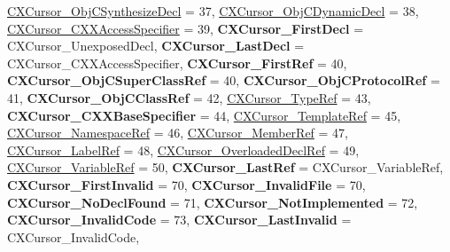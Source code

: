 \begin{DoxyCompactItemize}
\newline
\mbox{\hyperlink{group__CINDEX_ggaaccc432245b4cd9f2d470913f9ef0013a3d4faa898af63cdb556188e9804637a3}{C\+X\+Cursor\+\_\+\+Obj\+C\+Synthesize\+Decl}} = 37, 
\mbox{\hyperlink{group__CINDEX_ggaaccc432245b4cd9f2d470913f9ef0013aa4e9883af9df6a1526455e9a9ad5bc96}{C\+X\+Cursor\+\_\+\+Obj\+C\+Dynamic\+Decl}} = 38, 
\mbox{\hyperlink{group__CINDEX_ggaaccc432245b4cd9f2d470913f9ef0013a25a689b655871aec95dc68f1506b6833}{C\+X\+Cursor\+\_\+\+C\+X\+X\+Access\+Specifier}} = 39, 
{\bfseries C\+X\+Cursor\+\_\+\+First\+Decl} = C\+X\+Cursor\+\_\+\+Unexposed\+Decl, 
\newline
{\bfseries C\+X\+Cursor\+\_\+\+Last\+Decl} = C\+X\+Cursor\+\_\+\+C\+X\+X\+Access\+Specifier, 
{\bfseries C\+X\+Cursor\+\_\+\+First\+Ref} = 40, 
{\bfseries C\+X\+Cursor\+\_\+\+Obj\+C\+Super\+Class\+Ref} = 40, 
{\bfseries C\+X\+Cursor\+\_\+\+Obj\+C\+Protocol\+Ref} = 41, 
\newline
{\bfseries C\+X\+Cursor\+\_\+\+Obj\+C\+Class\+Ref} = 42, 
\mbox{\hyperlink{group__CINDEX_ggaaccc432245b4cd9f2d470913f9ef0013a8ac2a9bf8b26022033c2eeb1f303d308}{C\+X\+Cursor\+\_\+\+Type\+Ref}} = 43, 
{\bfseries C\+X\+Cursor\+\_\+\+C\+X\+X\+Base\+Specifier} = 44, 
\mbox{\hyperlink{group__CINDEX_ggaaccc432245b4cd9f2d470913f9ef0013aa175ea592545f4203927db3ecf9930b5}{C\+X\+Cursor\+\_\+\+Template\+Ref}} = 45, 
\newline
\mbox{\hyperlink{group__CINDEX_ggaaccc432245b4cd9f2d470913f9ef0013a8d7a69f91345139c2d48d078448d1d9a}{C\+X\+Cursor\+\_\+\+Namespace\+Ref}} = 46, 
\mbox{\hyperlink{group__CINDEX_ggaaccc432245b4cd9f2d470913f9ef0013ad4ef54b32cb900dfe32c4f582bf3cd61}{C\+X\+Cursor\+\_\+\+Member\+Ref}} = 47, 
\mbox{\hyperlink{group__CINDEX_ggaaccc432245b4cd9f2d470913f9ef0013a2b9b4f16f40168caa64cfe2fc5555584}{C\+X\+Cursor\+\_\+\+Label\+Ref}} = 48, 
\mbox{\hyperlink{group__CINDEX_ggaaccc432245b4cd9f2d470913f9ef0013adac756905dfd01f29f10732ec475e5df}{C\+X\+Cursor\+\_\+\+Overloaded\+Decl\+Ref}} = 49, 
\newline
\mbox{\hyperlink{group__CINDEX_ggaaccc432245b4cd9f2d470913f9ef0013a486b3ed7778e45331bbc3d32a62ee0da}{C\+X\+Cursor\+\_\+\+Variable\+Ref}} = 50, 
{\bfseries C\+X\+Cursor\+\_\+\+Last\+Ref} = C\+X\+Cursor\+\_\+\+Variable\+Ref, 
{\bfseries C\+X\+Cursor\+\_\+\+First\+Invalid} = 70, 
{\bfseries C\+X\+Cursor\+\_\+\+Invalid\+File} = 70, 
\newline
{\bfseries C\+X\+Cursor\+\_\+\+No\+Decl\+Found} = 71, 
{\bfseries C\+X\+Cursor\+\_\+\+Not\+Implemented} = 72, 
{\bfseries C\+X\+Cursor\+\_\+\+Invalid\+Code} = 73, 
{\bfseries C\+X\+Cursor\+\_\+\+Last\+Invalid} = C\+X\+Cursor\+\_\+\+Invalid\+Code, 

\end{DoxyCompactItemize}
